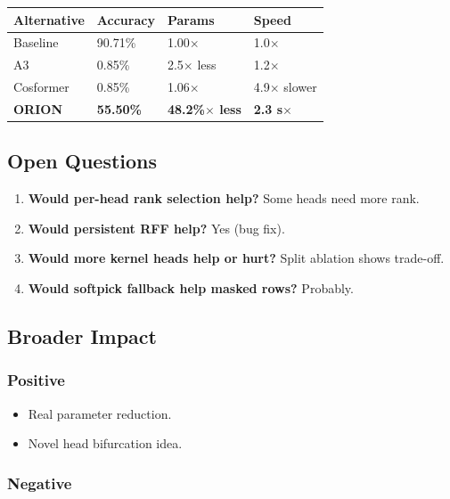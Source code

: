 \begin{table}[H]
\centering
\small
\begin{tabular}{llll}
\toprule
\textbf{Alternative} & \textbf{Accuracy} & \textbf{Params} & \textbf{Speed} \\
\midrule
Baseline & 90.71\% & 1.00$\times$ & 1.0$\times$ \\
A3 & 0.85\% & 2.5$\times$ less & 1.2$\times$ \\
Cosformer & 0.85\% & 1.06$\times$ & 4.9$\times$ slower \\
\textbf{ORION} & \textbf{55.50\%} & \textbf{48.2\%$\times$ less} & \textbf{2.3 s$\times$} \\
\bottomrule
\end{tabular}
\end{table}

\subsection{Open Questions}

\begin{enumerate}
\item \textbf{Would per-head rank selection help?} Some heads need more rank.
\item \textbf{Would persistent RFF help?} Yes (bug fix).
\item \textbf{Would more kernel heads help or hurt?} Split ablation shows trade-off.
\item \textbf{Would softpick fallback help masked rows?} Probably.

\end{enumerate}
\subsection{Broader Impact}

\subsubsection{Positive}

\begin{itemize}
\item Real parameter reduction.
\item Novel head bifurcation idea.

\end{itemize}
\subsubsection{Negative}

